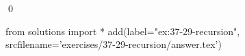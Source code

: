 
\begin{ex}
  \label{ex:37-29-recursion}
  
  \qed
\end{ex}
\begin{python0}
from solutions import *
add(label="ex:37-29-recursion",
    srcfilename='exercises/37-29-recursion/answer.tex')
\end{python0}
